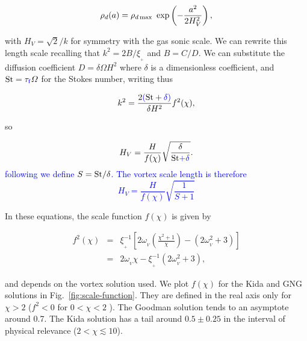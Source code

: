 \documentclass[apj]{emulateapj}
\def\blue#1{\textcolor{blue}{#1}}
\newcommand{\Fig}[1]{Fig.~\ref{#1}}
\newcommand{\fig}[1]{\Fig{#1}}
\newcommand{\beq}{\begin{equation}}
\newcommand{\eeq}{\end{equation}}
\newcommand{\beqn}{\begin{eqnarray}}
\newcommand{\eeqn}{\end{eqnarray}}
\newcommand{\epsp}{\xi_{_{+}}}
\newcommand{\tauf}{\tau_{\rm \blue{f}}}
\newcommand{\St}{{\rm St}}
\begin{document}
\beq
\rho_d(a) = \rho_{d\,{\rm max}} \ \exp\left(-\frac{a^2}{2H_V^2}\right),
\label{eq:gen_axi}
\eeq

\noindent with $H_V = \sqrt{2}/k$ for symmetry with the gas sonic scale. We can 
rewrite this length scale recalling that $k^2=2B/\epsp$ and
$B=C/D$. We can substitute the diffusion coefficient $D=\delta \varOmega H^2$ where 
$\delta$ is a dimensionless coefficient, and $\St = \tauf\varOmega$ for 
the Stokes number, writing thus 

\beqn
\label{eq:k}
k^2 = \frac{2\blue{(}\St+\blue{\delta)}}{\delta H^2} f^2(\chi),
\eeqn 

\noindent so

\beq
 H_V = \frac{H}{f(\chi)} \sqrt{\frac{\delta}{\St\blue{+\delta}}}. 
\label{eq:hv-pre}
\eeq
\noindent \blue{following \cite{Jacquet12} we define $S=\St/\delta$. The vortex scale
length is therefore
\beq
H_V = \frac{H}{f(\chi)} \sqrt{\frac{1}{S+1}}
\label{eq:hv}
\eeq}

\noindent In these equations, the scale function $f(\chi)$ is given by 

\beqn
f^2(\chi) &=& \epsp^{-1} \left[2\omega_{_V}\left(\frac{\chi^2+1}{\chi}\right) - (2\omega_{_V}^2 + 3) \right]\nonumber \\
          &=& 2\omega_{_V}\chi - \epsp^{-1}(2\omega_{_V}^2 + 3),
\label{eq:scale-function}
\eeqn

\noindent and depends on the vortex solution
used. We plot $f(\chi)$ for the Kida and GNG solutions in
\fig{fig:scale-function}. They are defined in the real axis only for $\chi > 2$ ($f^2
< 0$ for $0 < \chi < 2$ ). The Goodman solution tends to an asymptote
around 0.7. The Kida solution has a  tail around $0.5\pm0.25$ in the
interval of physical relevance ($2 < \chi \lesssim 10$). %
\end{document}
